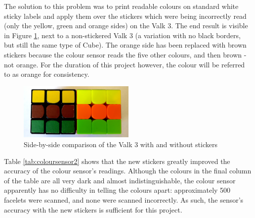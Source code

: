 \documentclass{report}
\begin{document}
	The solution to this problem was to print readable colours on standard white sticky labels and apply them over the stickers which were being incorrectly read (only the yellow, green and orange sides) on the Valk 3. The end result is visible in Figure \ref{fig:imgCubeStickersComparison}, next to a non-stickered Valk 3 (a variation with no black borders, but still the same type of Cube). The orange side has been replaced with brown stickers because the colour sensor reads the five other colours, and then brown - not orange. For the duration of this project however, the colour will be referred to as orange for consistency.

	\begin{figure}[H]
		\begin{center}
			\includegraphics[width=0.5\textwidth]{Resources/Images/imgCubeStickersComparison.jpg}
			\caption{Side-by-side comparison of the Valk 3 with and without stickers}
			\label{fig:imgCubeStickersComparison}
		\end{center}
	\end{figure}

	Table \ref{tab:coloursensor2} shows that the new stickers greatly improved the accuracy of the colour sensor's readings. Although the colours in the final column of the table are all very dark and almost indistinguishable, the colour sensor apparently has no difficulty in telling the colours apart: approximately 500 facelets were scanned, and none were scanned incorrectly. As such, the sensor's accuracy with the new stickers is sufficient for this project.
	
\end{document}
